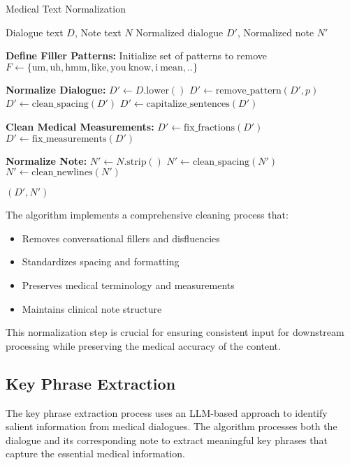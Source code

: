 \documentclass[11pt,a4paper]{article}
\begin{document}
\begin{algorithm}[H]
\caption{Medical Text Normalization}
\label{alg:text_normalization}
\begin{algorithmic}[1]
\Require Dialogue text $D$, Note text $N$
\Ensure Normalized dialogue $D'$, Normalized note $N'$

\State \textbf{Define Filler Patterns:} Initialize set of patterns to remove
\State $F \gets \{\mathrm{um}, \mathrm{uh}, \mathrm{hmm}, \mathrm{like}, \mathrm{you\ know}, \mathrm{i\ mean},..\}$

\State \textbf{Normalize Dialogue:}
\State $D' \gets D.\mathrm{lower}()$ 
    \State $D' \gets \mathrm{remove\_pattern}(D', p)$
\EndFor
\State $D' \gets \mathrm{clean\_spacing}(D')$ 
\State $D' \gets \mathrm{capitalize\_sentences}(D')$ 

\State \textbf{Clean Medical Measurements:}
\State $D' \gets \mathrm{fix\_fractions}(D')$ 
\State $D' \gets \mathrm{fix\_measurements}(D')$ 

\State \textbf{Normalize Note:}
\State $N' \gets N.\mathrm{strip}()$ 
\State $N' \gets \mathrm{clean\_spacing}(N')$ 
\State $N' \gets \mathrm{clean\_newlines}(N')$ 

\Return $(D', N')$

\end{algorithmic}
\end{algorithm}

The algorithm implements a comprehensive cleaning process that:
\begin{itemize}
    \item Removes conversational fillers and disfluencies
    \item Standardizes spacing and formatting
    \item Preserves medical terminology and measurements
    \item Maintains clinical note structure
\end{itemize}

This normalization step is crucial for ensuring consistent input for downstream processing while preserving the medical accuracy of the content.

\subsection{Key Phrase Extraction}
The key phrase extraction process uses an LLM-based approach to identify salient information from medical dialogues. The algorithm processes both the dialogue and its corresponding note to extract meaningful key phrases that capture the essential medical information.
\end{document}
